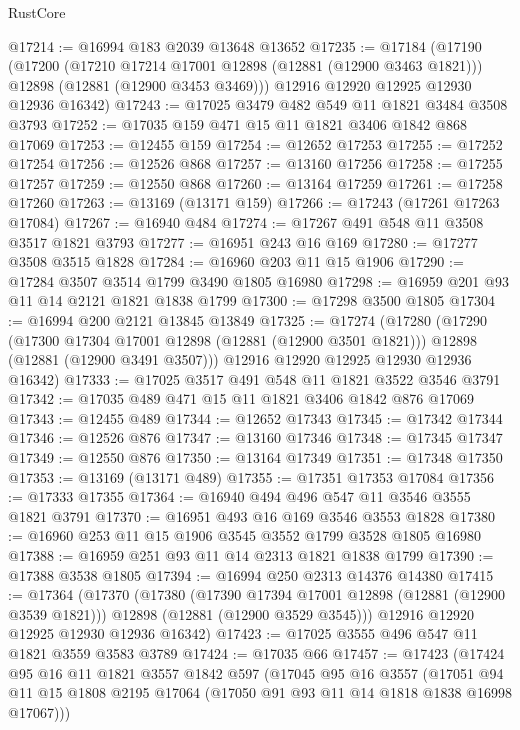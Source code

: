 \begin{lexlean}{RustCore}
\begin{coremodule}
@17214 := @16994 @183 @2039 @13648 @13652
@17235 := @17184
    (@17190
      (@17200
        (@17210 @17214 @17001 @12898 (@12881 (@12900 @3463 @1821)))
        @12898
        (@12881 (@12900 @3453 @3469)))
      @12916
      @12920
      @12925
      @12930
      @12936
      @16342)
@17243 := @17025 @3479 @482 @549 @11 @1821 @3484 @3508 @3793
@17252 := @17035 @159 @471 @15 @11 @1821 @3406 @1842 @868 @17069
@17253 := @12455 @159
@17254 := @12652 @17253
@17255 := @17252 @17254
@17256 := @12526 @868
@17257 := @13160 @17256
@17258 := @17255 @17257
@17259 := @12550 @868
@17260 := @13164 @17259
@17261 := @17258 @17260
@17263 := @13169 (@13171 @159)
@17266 := @17243 (@17261 @17263 @17084)
@17267 := @16940 @484
@17274 := @17267 @491 @548 @11 @3508 @3517 @1821 @3793
@17277 := @16951 @243 @16 @169
@17280 := @17277 @3508 @3515 @1828
@17284 := @16960 @203 @11 @15 @1906
@17290 := @17284 @3507 @3514 @1799 @3490 @1805 @16980
@17298 := @16959 @201 @93 @11 @14 @2121 @1821 @1838 @1799
@17300 := @17298 @3500 @1805
@17304 := @16994 @200 @2121 @13845 @13849
@17325 := @17274
    (@17280
      (@17290
        (@17300 @17304 @17001 @12898 (@12881 (@12900 @3501 @1821)))
        @12898
        (@12881 (@12900 @3491 @3507)))
      @12916
      @12920
      @12925
      @12930
      @12936
      @16342)
@17333 := @17025 @3517 @491 @548 @11 @1821 @3522 @3546 @3791
@17342 := @17035 @489 @471 @15 @11 @1821 @3406 @1842 @876 @17069
@17343 := @12455 @489
@17344 := @12652 @17343
@17345 := @17342 @17344
@17346 := @12526 @876
@17347 := @13160 @17346
@17348 := @17345 @17347
@17349 := @12550 @876
@17350 := @13164 @17349
@17351 := @17348 @17350
@17353 := @13169 (@13171 @489)
@17355 := @17351 @17353 @17084
@17356 := @17333 @17355
@17364 := @16940 @494 @496 @547 @11 @3546 @3555 @1821 @3791
@17370 := @16951 @493 @16 @169 @3546 @3553 @1828
@17380 := @16960 @253 @11 @15 @1906 @3545 @3552 @1799 @3528 @1805 @16980
@17388 := @16959 @251 @93 @11 @14 @2313 @1821 @1838 @1799
@17390 := @17388 @3538 @1805
@17394 := @16994 @250 @2313 @14376 @14380
@17415 := @17364
    (@17370
      (@17380
        (@17390 @17394 @17001 @12898 (@12881 (@12900 @3539 @1821)))
        @12898
        (@12881 (@12900 @3529 @3545)))
      @12916
      @12920
      @12925
      @12930
      @12936
      @16342)
@17423 := @17025 @3555 @496 @547 @11 @1821 @3559 @3583 @3789
@17424 := @17035 @66
@17457 := @17423
    (@17424
      @95
      @16
      @11
      @1821
      @3557
      @1842
      @597
      (@17045
        @95
        @16
        @3557
        (@17051 @94 @11 @15 @1808 @2195 @17064 (@17050 @91 @93 @11 @14 @1818 @1838 @16998 @17067)))

\end{coremodule}
\end{lexlean}
